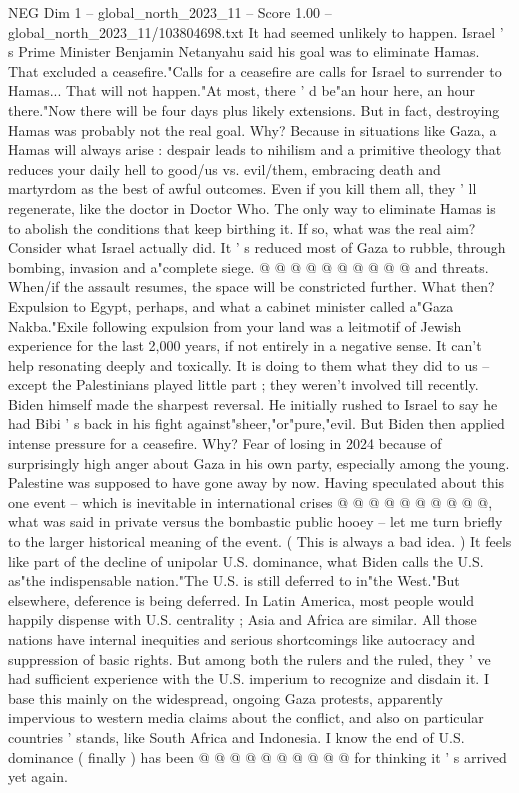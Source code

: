 \begin{textsample}{NEG Dim 1 – global\_north\_2023\_11 – Score 1.00 – global\_north\_2023\_11/103804698.txt}  \label{ex:f1_neg_191}
It had seemed unlikely to happen.
Israel ' s Prime Minister Benjamin Netanyahu said his goal was to eliminate Hamas.
That excluded a ceasefire."Calls for a ceasefire are calls for Israel to surrender to Hamas...
That will not happen."At most, there ' d be"an hour here, an hour there."Now there will be four days plus likely extensions.
But in fact, destroying Hamas was probably not the real goal.
Why?
Because in situations like Gaza, a Hamas will always arise : despair leads to nihilism and a primitive theology that reduces your daily hell to good/us vs. evil/them, embracing death and martyrdom as the best of awful outcomes.
Even if you kill them all, they ' ll regenerate, like the doctor in Doctor Who.
The only way to eliminate Hamas is to abolish the conditions that keep birthing it.
If so, what was the real aim?
Consider what Israel actually did.
It ' s reduced most of Gaza to rubble, through bombing, invasion and a"complete siege. @ @ @ @ @ @ @ @ @ @ and threats.
When/if the assault resumes, the space will be constricted further.
What then?
Expulsion to Egypt, perhaps, and what a cabinet minister called a"Gaza Nakba."Exile following expulsion from your land was a leitmotif of Jewish experience for the last 2,000 years, if not entirely in a negative sense.
It can't help resonating deeply and toxically.
It is doing to them what they did to us -- except the Palestinians played little part ; they weren't involved till recently.
Biden himself made the sharpest reversal.
He initially rushed to Israel to say he had Bibi ' s back in his fight against"sheer,"or"pure,"evil.
But Biden then applied intense pressure for a ceasefire.
Why?
Fear of losing in 2024 because of surprisingly high anger about Gaza in his own party, especially among the young.
Palestine was supposed to have gone away by now.
Having speculated about this one event -- which is inevitable in international crises @ @ @ @ @ @ @ @ @ @, what was said in private versus the bombastic public hooey -- let me turn briefly to the larger historical meaning of the event. ( This is always a bad idea. ) It feels like part of the decline of unipolar U.S. dominance, what Biden calls the U.S. as"the indispensable nation."The U.S. is still deferred to in"the West."But elsewhere, deference is being deferred.
In Latin America, most people would happily dispense with U.S. centrality ; Asia and Africa are similar.
All those nations have internal inequities and serious shortcomings like autocracy and suppression of basic rights.
But among both the rulers and the ruled, they ' ve had sufficient experience with the U.S. imperium to recognize and disdain it.
I base this mainly on the widespread, ongoing Gaza protests, apparently impervious to western media claims about the conflict, and also on particular countries ' stands, like South Africa and Indonesia.
I know the end of U.S. dominance ( finally ) has been @ @ @ @ @ @ @ @ @ @ for thinking it ' s arrived yet again.

\end{textsample}
